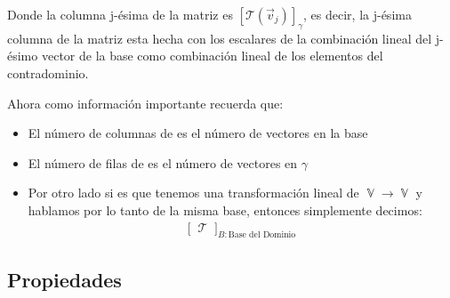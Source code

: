 \documentclass[12pt, fleqn]{report}                             %
\theoremstyle{break}                                            %
\DeclareMathOperator \VectorSet    {\mathbb{V}}                 %
\DeclareMathOperator \LinTrans {\mathcal{T}}                    %
\newcommand{\Brackets}[1]    {\left[ #1 \right]}                %
\newcommand{\BigBrackets}[1] {\Big[ \; #1 \; \Big]}             %
\newcommand{\Wrap}[1]    {\left( #1 \right)}                    %
\newcommand{\FnLinTrans}[1]{\mathcal{T}\Wrap{#1}}               %
\begin{document}
                Donde la columna j-ésima de la matriz es $\Brackets{\FnLinTrans{\vec v_j}}_{\gamma}$,
                es decir, la j-ésima columna de la matriz esta hecha con los escalares de la combinación
                lineal del j-ésimo vector de la base como combinación lineal de los elementos del contradominio.

                Ahora como información importante recuerda que:
                \begin{itemize}
                    \item 
                        El número de columnas de es el número de vectores en la base
                    \item 
                        El número de filas de es el número de vectores en $\gamma$
                    \item
                        Por otro lado si es que tenemos una transformación lineal de $\VectorSet \to \VectorSet$
                        y hablamos por lo tanto de la misma base, entonces simplemente decimos:
                        \begin{align*}
                        \BigBrackets{\LinTrans}_{B: \text{Base del Dominio}}
                    \end{align*}
                \end{itemize}


            \clearpage
            \subsection{Propiedades}
\end{document}
